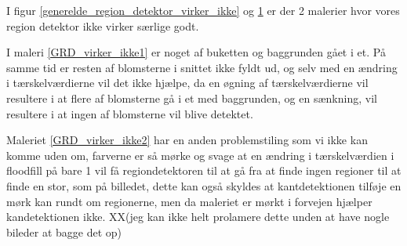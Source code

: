 \begin{figure}[!h]
    \centering
   \hspace{1em}
     \label{generelde_region_detektor_virker_ikke2}
\end{figure}

I figur \ref{generelde_region_detektor_virker_ikke} og
\ref{generelde_region_detektor_virker_ikke2} er der 2 malerier hvor
vores region detektor ikke virker særlige godt. 

I maleri \ref{GRD_virker_ikke1} er noget af buketten og baggrunden gået
i et. På samme tid er resten af blomsterne i snittet ikke fyldt ud, og
selv med en ændring i tærskelværdierne vil det ikke hjælpe, da en øgning
af tærskelværdierne vil resultere i at flere af blomsterne gå i et med
baggrunden, og en sænkning, vil resultere i at ingen af blomsterne vil
blive detektet. 

Maleriet \ref{GRD_virker_ikke2} har en anden problemstiling som vi ikke
kan komme uden om, farverne er så mørke og svage at en ændring i
tærskelværdien i floodfill på bare 1 vil få regiondetektoren til at gå
fra at finde ingen regioner til at finde en stor, som på billedet, dette
kan også skyldes at kantdetektionen tilføje en mørk kan rundt om
regionerne, men da maleriet er mørkt i forvejen hjælper kandetektionen
ikke. XX(jeg kan ikke helt prolamere dette unden at have nogle bileder
at bagge det op)

